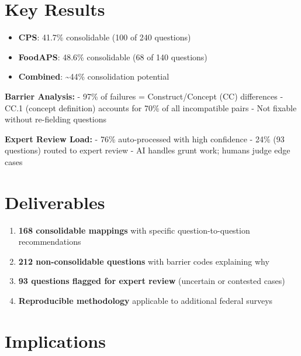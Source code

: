 \documentclass[
  letterpaper,
]{report}
\providecommand{\tightlist}{%
  \setlength{\itemsep}{0pt}\setlength{\parskip}{0pt}}
\begin{document}
\section*{Key Results}\label{key-results}


\begin{itemize}
\tightlist
\item
  \textbf{CPS}: 41.7\% consolidable (100 of 240 questions)
\item
  \textbf{FoodAPS}: 48.6\% consolidable (68 of 140 questions)
\item
  \textbf{Combined}: \textasciitilde44\% consolidation potential
\end{itemize}

\textbf{Barrier Analysis:} - 97\% of failures = Construct/Concept (CC)
differences - CC.1 (concept definition) accounts for 70\% of all
incompatible pairs - Not fixable without re-fielding questions

\textbf{Expert Review Load:} - 76\% auto-processed with high confidence
- 24\% (93 questions) routed to expert review - AI handles grunt work;
humans judge edge cases

\section*{Deliverables}\label{deliverables}


\begin{enumerate}
\def\labelenumi{\arabic{enumi}.}
\tightlist
\item
  \textbf{168 consolidable mappings} with specific question-to-question
  recommendations
\item
  \textbf{212 non-consolidable questions} with barrier codes explaining
  why
\item
  \textbf{93 questions flagged for expert review} (uncertain or
  contested cases)
\item
  \textbf{Reproducible methodology} applicable to additional federal
  surveys
\end{enumerate}

\section*{Implications}\label{implications}
\end{document}
